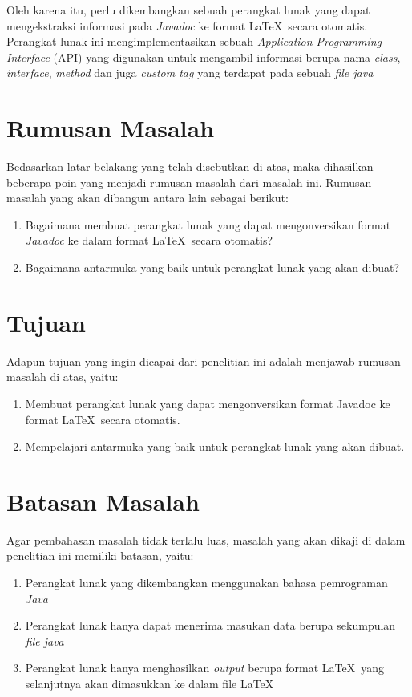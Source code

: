 Oleh karena itu, perlu dikembangkan sebuah perangkat lunak yang dapat mengekstraksi informasi pada {\it Javadoc} ke format \LaTeX\ secara otomatis. Perangkat lunak ini mengimplementasikan sebuah {\it Application Programming Interface} (API) yang digunakan untuk mengambil informasi berupa nama {\it class}, {\it interface}, {\it method} dan juga {\it custom tag} yang terdapat pada sebuah {\it file java}

\section{Rumusan Masalah}
\label{sec:rumusan}
Bedasarkan latar belakang yang telah disebutkan di atas, maka dihasilkan beberapa poin yang menjadi rumusan masalah dari masalah ini. Rumusan masalah yang akan dibangun antara lain sebagai berikut:
\begin{enumerate}
	\item Bagaimana membuat perangkat lunak yang dapat mengonversikan format {\it Javadoc} ke dalam format \LaTeX\ secara otomatis?
	\item Bagaimana antarmuka yang baik untuk perangkat lunak yang akan dibuat?
\end{enumerate}

\section{Tujuan}
\label{sec:tujuan}
Adapun tujuan yang ingin dicapai dari penelitian ini adalah menjawab rumusan masalah di atas, yaitu:
\begin{enumerate}
	\item Membuat perangkat lunak yang dapat mengonversikan format Javadoc ke format \LaTeX\ secara otomatis.
	\item Mempelajari antarmuka yang baik untuk perangkat lunak yang akan dibuat.
\end{enumerate}

\section{Batasan Masalah}
\label{sec:batasan}
Agar pembahasan masalah tidak terlalu luas, masalah yang akan dikaji di dalam penelitian ini memiliki batasan, yaitu:
\begin{enumerate}
	\item Perangkat lunak yang dikembangkan menggunakan bahasa pemrograman {\it Java}
	\item Perangkat lunak hanya dapat menerima masukan data berupa sekumpulan {\it file java}
	\item Perangkat lunak hanya menghasilkan {\it output } berupa format \LaTeX\ yang selanjutnya akan dimasukkan ke dalam file \LaTeX
\end{enumerate}

